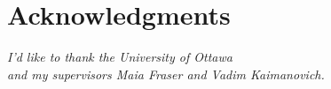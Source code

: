 \section{Acknowledgments}
\vspace{5cm}
\begin{center}
  \begin{minipage}[c]{0.7\linewidth}
    \begin{center}
      \vspace{1cm}
      \textit{I'd like to thank the University of Ottawa \\
        and my supervisors Maia Fraser and Vadim Kaimanovich.}
    \end{center}
  \end{minipage}
\end{center}

